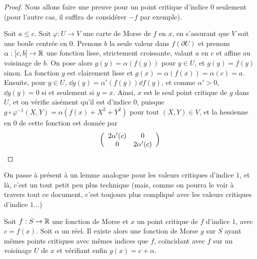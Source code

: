 \begin{proof}
    Nous allons faire une preuve pour un point critique d'indice $0$ seulement (pour l'autre cas, 
    il suffira de considérer $-f$ par exemple). 

    Soit $a\leq c$. Soit $\varphi:U\to V$ une carte de Morse de $f$ en $x$, en s'assurant que 
    $V$ soit une boule centrée en $0$. 
    Prenons $b$ la seule valeur dans $f(\partial U)$ et prenons $\alpha:[c,b]\to\operatorname{\mathbb R}$ une fonction 
    lisse, strictement croissante, valant $a$ en $c$ et affine au voisinage de $b$. 
    On pose alors $g(y)=\alpha(f(y))$ pour $y\in U$, et $g(y)=f(y)$ sinon.
    La fonction $g$ est clairement lisse et $g(x)=\alpha(f(x))=\alpha(c)=a$.
    Ensuite, pour $y\in U$, $\dd g(y)=\alpha'(f(y))\dd f(y)$, et comme $\alpha'>0$, $\dd g(y)=0$ 
    si et seulement si $y=x$. 
    Ainsi, $x$ est le seul point critique de $g$ dans $U$, et on vérifie aisément qu'il est 
    d'indice $0$, puisque $g\circ\varphi^{-1}(X,Y)=\alpha(f(x)+X^2+Y^2)$ pour tout $(X,Y)\in V$, 
    et  la hessienne en $0$ de cette fonction est donnée par 
    \[
        \left(\begin{array}{c c} 2\alpha'(c) & 0\\ 0 & 2\alpha'(c)\end{array}\right)
    \]
\end{proof}

On passe à présent à un lemme analogue pour les valeurs critiques d'indice $1$, et là, c'est un 
tout petit peu plus technique (mais, comme on pourra le voir à travers tout ce document, c'est 
toujours plus compliqué avec les valeurs critiques d'indice $1$...)

\begin{lem}
    Soit $f:S\to\operatorname{\mathbb R}$ une fonction de Morse et $x$ un point critique de $f$ d'indice $1$, avec 
    $c=f(x)$.
    Soit $\alpha$ un réel. 
    Il existe alors une fonction de Morse $g$ sur $S$ ayant mêmes points critiques avec mêmes 
    indices que $f$, coïncidant avec $f$ sur un voisinage $U$ de $x$ et vérifiant enfin 
    $g(x)=c+\alpha$. 
\end{lem}

